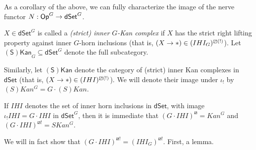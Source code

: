 \documentclass[a4paper,10pt,draft]{article}%
\begin{document}
\newpage


As a corollary of the above, we can fully characterize the image of the nerve functor $N: \mathsf{Op}^G \to \mathsf{dSet}^G$.

\begin{definition}
      $X \in \mathsf{dSet}^G$ is called a \textit{(strict) inner $G$-Kan complex} if
      $X$ has the strict right lifting property against inner $G$-horn inclusions
      (that is, $(X \to \**) \in (IHI_G)^{\boxslash (!)}$).
      Let $\mathsf{(S)Kan}_G \subseteq \mathsf{dSet}^G$ denote the full subcategory.

      Similarly, let $\mathsf{(S)Kan}$ denote the category of
      (strict) inner Kan complexes in $\mathsf{dSet}$
      (that is, $(X \to \**) \in (IHI)^{\boxslash (!)}$).
      We will denote their image under $\iota_!$ by $(S)Kan^G = G \cdot (S)Kan$.
\end{definition}

\begin{remark}
      If $IHI$ denotes the set of inner horn inclusions in $\mathsf{dSet}$,
      with image $\iota_! IHI = G \cdot IHI$ in $\mathsf{dSet}^G$,
      then it is immediate that $(G \cdot IHI)^{\boxslash} = Kan^G$ and $(G \cdot IHI)^{\boxslash !} = SKan^G$.
\end{remark}

We will in fact show that $(G \cdot IHI)^{\boxslash !} = (IHI_G)^{\boxslash !}$.
First, a lemma.
\end{document}
